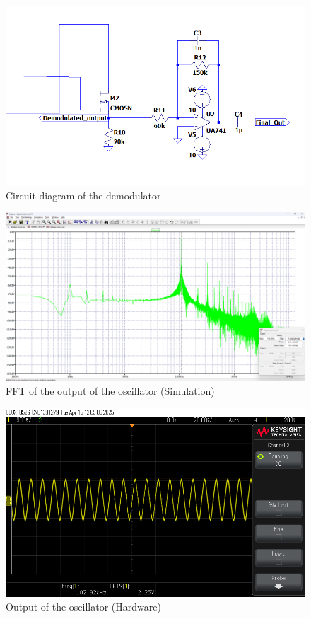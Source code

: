 \documentclass[conference]{IEEEtran}
\begin{document}
\begin{figure}
    \centering
    \includegraphics[width=1\linewidth]{Images/Demodulator_ltspice.png}
    \caption{Circuit diagram of the demodulator}
\end{figure}

\begin{figure}
    \centering
    \includegraphics[width=1\linewidth]{Images/fft_sine_osc.png}
    \caption{FFT of the output of the oscillator (Simulation)}
\end{figure}

\begin{figure}
    \centering
    \includegraphics[width=1\linewidth]{Images/osc_circuit_out.png}
    \caption{Output of the oscillator (Hardware)}
\end{figure}
\end{document}
